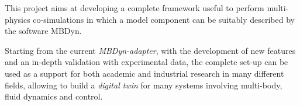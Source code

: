 This project aims at developing a complete framework useful to perform multi-physics co-simulations in which a model component can be suitably described by the software MBDyn.  

Starting from the current \textit{MBDyn-adapter}, with the development of new features and an in-depth validation with experimental data, the complete set-up can be used as a support for both academic and industrial research in many different fields, allowing to build a \textit{digital twin} for many systems involving multi-body, fluid dynamics and control.